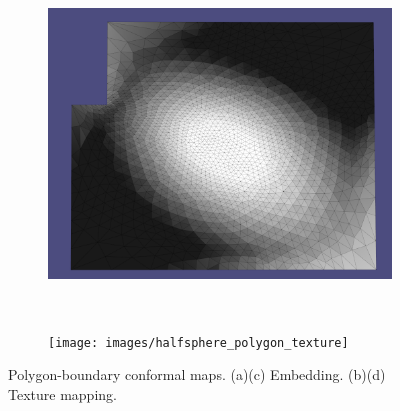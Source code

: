 \begin{figure}
\begin{subfigure}{0.3\textwidth}
\caption{}
\end{subfigure}

\begin{subfigure}{0.3\textwidth}
\includegraphics[height = \textwidth]{images/halfsphere_polygon_emb}
\caption{}
\end{subfigure}\ \ \ \ \ \ \ \ \ \ \ \ \
\begin{subfigure}{0.3\textwidth}
\texttt{[image: images/halfsphere\_polygon\_texture]}
\caption{}
\end{subfigure}
\caption{Polygon-boundary conformal maps. (a)(c) Embedding. (b)(d) Texture mapping.}
\label{fig:boundary-free}
\end{figure}












